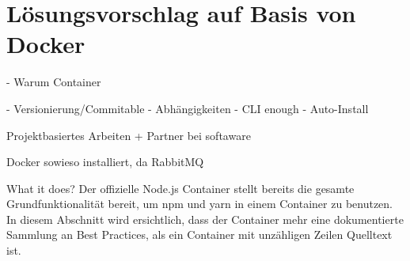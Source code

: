 \chapter{Lösungsvorschlag auf Basis von Docker}
\label{cha:possible-solution}



- Warum Container


- Versionierung/Commitable
- Abhängigkeiten
- CLI enough
- Auto-Install


Projektbasiertes Arbeiten + Partner bei softaware

Docker sowieso installiert, da RabbitMQ



What it does?
Der offizielle Node.js Container stellt bereits die gesamte Grundfunktionalität bereit, um npm und yarn in einem Container zu benutzen.
In diesem Abschnitt wird ersichtlich, dass der Container mehr eine dokumentierte Sammlung an Best Practices, als ein Container mit unzähligen Zeilen Quelltext ist.
